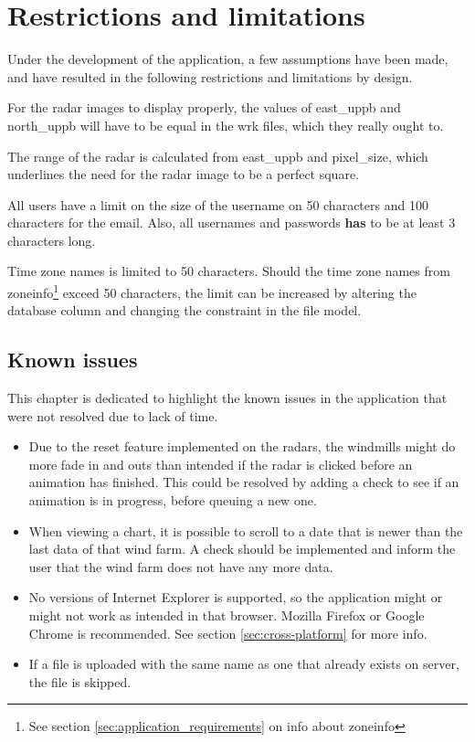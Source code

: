 \chapter{Restrictions and limitations}
\label{sec:restrictions_and_limitations}
Under the development of the application, a few assumptions have been made, and have resulted in the following restrictions and limitations by design.

For the radar images to display properly, the values of \textsf{east\_uppb} and \textsf{north\_uppb} will have to be equal in the \textsf{wrk} files, which they really ought to.

The range of the radar is calculated from \textsf{east\_uppb} and \textsf{pixel\_size}, which underlines the need for the radar image to be a perfect square.

All users have a limit on the size of the username on 50 characters and 100 characters for the email.
Also, all usernames and passwords \textbf{has} to be at least 3 characters long.

Time zone names is limited to 50 characters. Should the time zone names from zoneinfo\footnote{See section \ref{sec:application_requirements} on info about zoneinfo} exceed 50 characters, the limit can be increased by altering the database column and changing the constraint in the file model.

\section{Known issues}
\label{sec:known_issues}
This chapter is dedicated to highlight the known issues in the application that were not resolved due to lack of time.
\begin{itemize}
\item Due to the reset feature implemented on the radars, the windmills might do more fade in and outs than intended if the radar is clicked before an animation has finished.
This could be resolved by adding a check to see if an animation is in progress, before queuing a new one.
\item When viewing a chart, it is possible to scroll to a date that is newer than the last data of that wind farm. A check should be implemented and inform the user that the wind farm does not have any more data.
\item No versions of Internet Explorer is supported, so the application might or might not work as intended in that browser. Mozilla Firefox or Google Chrome is recommended. See section \ref{sec:cross-platform} for more info.
\item If a file is uploaded with the same name as one that already exists on server, the file is skipped.
\end{itemize}